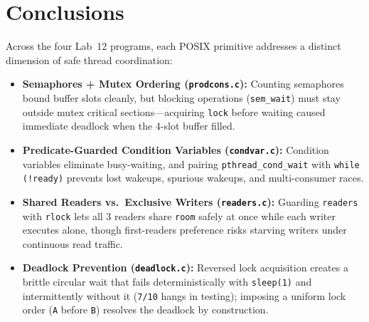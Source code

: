 \documentclass[12pt,a4paper]{article}
\begin{document}
\section{Conclusions}

Across the four Lab~12 programs, each POSIX primitive addresses a distinct dimension of safe thread coordination:
\begin{itemize}
    \item \textbf{Semaphores + Mutex Ordering (\texttt{prodcons.c}):} Counting semaphores bound buffer slots cleanly, but blocking operations (\texttt{sem\_\allowbreak wait}) must stay outside mutex critical sections---acquiring \texttt{lock} before waiting caused immediate deadlock when the 4-slot buffer filled.
    \item \textbf{Predicate-Guarded Condition Variables (\texttt{condvar.c}):} Condition variables eliminate busy-waiting, and pairing \texttt{pthread\_\allowbreak cond\_\allowbreak wait} with \texttt{while (!ready)} prevents lost wakeups, spurious wakeups, and multi-consumer races.
    \item \textbf{Shared Readers vs.\ Exclusive Writers (\texttt{readers.c}):} Guarding \texttt{readers} with \texttt{rlock} lets all 3 readers share \texttt{room} safely at once while each writer executes alone, though first-readers preference risks starving writers under continuous read traffic.
    \item \textbf{Deadlock Prevention (\texttt{deadlock.c}):} Reversed lock acquisition creates a brittle circular wait that fails deterministically with \texttt{sleep(1)} and intermittently without it (\texttt{7/10} hangs in testing); imposing a uniform lock order (\texttt{A} before \texttt{B}) resolves the deadlock by construction.
\end{itemize}
\end{document}
